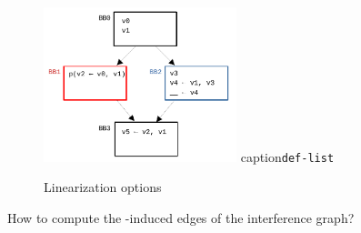 \documentclass[12pt]{article}
\begin{document}
\begin{figure}[t!]
  \centering
  \includegraphics[width=0.5\textwidth]{cfg}
  caption{\texttt{def-list} }
\end{figure}

\begin{figure}[t!]
  \centering
   \hfill
  \caption{Linearization options}
  \label{fig:linearization-options}
\end{figure}

How to compute the \AMi-induced edges of the interference graph?
\end{document}
